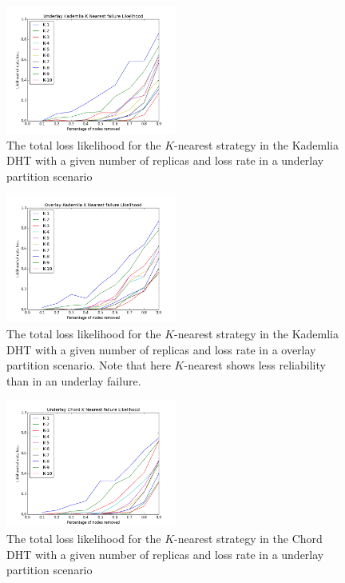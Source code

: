 	
	\begin{figure}[h!]
		\includegraphics[width=0.5\textwidth]{figs/underlay_kad_nearest}
		\caption{The total loss likelihood for the $K$-nearest strategy in the Kademlia DHT with a given number of replicas and loss rate in a underlay partition scenario}
	\end{figure}
	\begin{figure}[h!]
		\includegraphics[width=0.5\textwidth]{figs/overlay_kad_nearest}
		\caption{The total loss likelihood for the $K$-nearest strategy in the Kademlia DHT with a given number of replicas and loss rate in a overlay partition scenario. Note that here $K$-nearest shows less reliability than in an underlay failure.}
	\end{figure}
	\begin{figure}[h!]
		\includegraphics[width=0.5\textwidth]{figs/underlay_chord_nearest}
		\caption{The total loss likelihood for the $K$-nearest strategy in the Chord DHT with a given number of replicas and loss rate in a underlay partition scenario}
	\end{figure}
